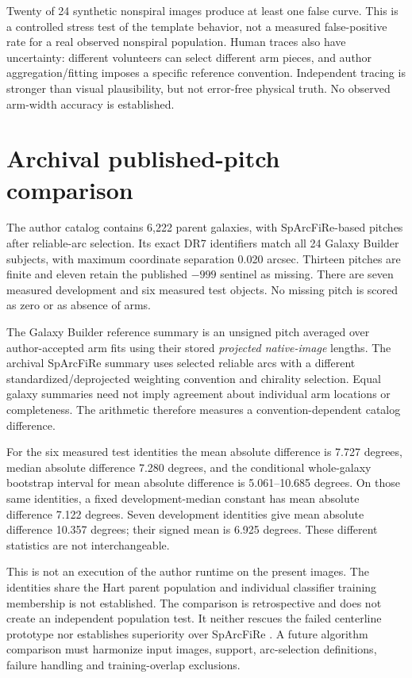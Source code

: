 \documentclass[10pt]{article}
\begin{document}
Twenty of 24 synthetic nonspiral images produce at least one false curve.
This is a controlled stress test of the template behavior, not a measured
false-positive rate for a real observed nonspiral population. Human traces
also have uncertainty: different volunteers can select different arm pieces,
and author aggregation/fitting imposes a specific reference convention.
Independent tracing is stronger than visual plausibility, but not error-free
physical truth. No observed arm-width accuracy is established.

\section{Archival published-pitch comparison}
The \citet{hart2017} author catalog contains 6,222 parent galaxies, with
SpArcFiRe-based pitches after reliable-arc selection. Its exact DR7 identifiers
match all 24 Galaxy Builder subjects, with maximum coordinate separation
0.020 arcsec. Thirteen pitches are finite and eleven retain the published
$-999$ sentinel as missing. There are seven measured development and six
measured test objects. No missing pitch is scored as zero or as absence of arms.

The Galaxy Builder reference summary is an unsigned pitch averaged over
author-accepted arm fits using their stored \emph{projected native-image}
lengths. The archival SpArcFiRe summary uses selected reliable arcs with a
different standardized/deprojected weighting convention and chirality
selection. Equal galaxy summaries need not imply agreement about individual
arm locations or completeness. The arithmetic therefore measures a
convention-dependent catalog difference.

For the six measured test identities the mean absolute difference is
7.727 degrees, median absolute difference 7.280 degrees, and the conditional
whole-galaxy bootstrap interval for mean absolute difference is
5.061--10.685 degrees. On those same identities, a fixed development-median
constant has mean absolute difference 7.122 degrees. Seven development
identities give mean absolute difference 10.357 degrees; their signed mean
is 6.925 degrees. These different statistics are not interchangeable.

This is not an execution of the author runtime on the present images.
The identities share the Hart parent population and individual classifier
training membership is not established. The comparison is retrospective and
does not create an independent population test. It neither rescues the
failed centerline prototype nor establishes superiority over SpArcFiRe
\citep{davis2014,hart2017}. A future algorithm comparison must harmonize
input images, support, arc-selection definitions, failure handling and
training-overlap exclusions.
\end{document}
